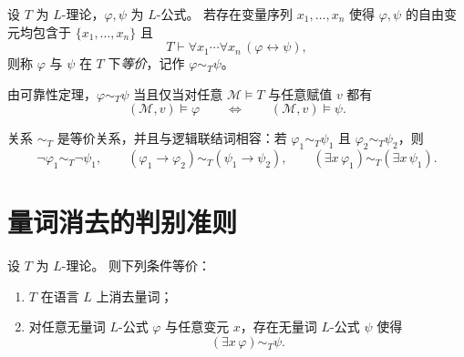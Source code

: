\documentclass[lang=cn,a4paper,newtx,section]{elegantbook}
\begin{document}
\begin{definition}[$T$-等价]
\label{t-equivalence}
设 $T$ 为 $L$-理论，$\varphi,\psi$ 为 $L$-公式。
若存在变量序列 $x_1,\dots,x_n$ 使得 $\varphi,\psi$ 的自由变元均包含于 $\{x_1,\dots,x_n\}$ 且
\[
  T\vdash\forall x_1\cdots\forall x_n\,(\varphi\leftrightarrow\psi),
\]
则称 $\varphi$ 与 $\psi$ 在 $T$ 下\emph{等价}，记作 $\varphi\sim_T\psi$。
\end{definition}

\begin{remark}
\label{t-equivalence-semantic}
由可靠性定理，$\varphi\sim_T\psi$ 当且仅当对任意 $\mathcal M\models T$ 与任意赋值 $v$ 都有
\[
  (\mathcal M,v)\models\varphi\qquad\Longleftrightarrow\qquad (\mathcal M,v)\models\psi.
\]
\end{remark}

\begin{remark}
\label{t-equivalence-basic}
关系 $\sim_T$ 是等价关系，并且与逻辑联结词相容：若 $\varphi_1\sim_T\psi_1$ 且 $\varphi_2\sim_T\psi_2$，则
\[
  \neg\varphi_1\sim_T\neg\psi_1,\qquad (\varphi_1\to\varphi_2)\sim_T(\psi_1\to\psi_2),\qquad (\exists x\,\varphi_1)\sim_T(\exists x\,\psi_1).
\]
\end{remark}

\section{量词消去的判别准则}

\begin{lemma}
\label{qe-characterization}
设 $T$ 为 $L$-理论。
则下列条件等价：
\begin{enumerate}
  \item $T$ 在语言 $L$ 上消去量词；
  \item 对任意无量词 $L$-公式 $\varphi$ 与任意变元 $x$，存在无量词 $L$-公式 $\psi$ 使得
  \[
    (\exists x\,\varphi)\sim_T\psi.
  \]
\end{enumerate}
\end{lemma}
\end{document}
